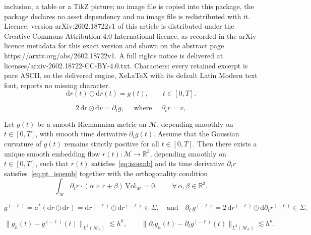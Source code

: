 \documentclass[10pt,a4paper]{amsart}
\newcommand{\Man}{\mathcal{M}}
\newcommand{\Vol}{\mathrm{Vol}}
\begin{document}
inclusion, a table or a TikZ picture; no image file is copied into this package, the package declares no asset dependency and no image file is redistributed with it. Licence: version arXiv:2602.18722v1 of this article is distributed under the Creative Commons Attribution 4.0 International licence, as recorded in the arXiv licence metadata for this exact version and shown on the abstract page https://arxiv.org/abs/2602.18722v1. A full rights notice is delivered at licenses/arxiv-2602.18722-CC-BY-4.0.txt. Characters: every retained excerpt is pure ASCII, so the delivered engine, XeLaTeX with its default Latin Modern text font, reports no missing character.
\begin{equation}\label{eq:isoemb}
\mathrm{d}r(t)\odot \mathrm{d}r(t)=g(t),\qquad t\in[0,T].
\end{equation}

\begin{equation}\label{eq:pt_isoemb}
2\,\mathrm{d}r \odot \mathrm{d}v = \partial_t g,
\quad \text{ where } \quad 
\partial_t r = v,
\end{equation}

\begin{theorem}\label{thm:wely-emb}
Let \(g(t)\) be a smooth Riemannian metric on \(\Man\), depending smoothly on \(t\in[0,T]\), with smooth time derivative \(\partial_t g(t)\).
Assume that the Gaussian curvature of \(g(t)\) remains strictly positive for all \(t\in[0,T]\).
Then there exists a {unique} smooth embedding flow \(r(t):\Man\to\mathbb{R}^3\), depending smoothly on \(t\in[0,T]\), such that \(r(t)\) satisfies~\eqref{eq:isoemb} and its time derivative \(\partial_t r\) satisfies~\eqref{eq:pt_isoemb} together with the orthogonality condition
\begin{equation}\label{eq:ptr_orth_RM}
\int_{\Man} \partial_t r \cdot (\alpha \times r + \beta)\,\Vol_{\Man} = 0,
\qquad \forall\, \alpha,\beta \in \mathbb{R}^3.
\end{equation}
\end{theorem}

\begin{equation}\label{eq:g_ell}
g^{(-\ell)} = a^*(\mathrm{d}r\odot \mathrm{d}r)
= \mathrm{d}r^{(-\ell)}\odot \mathrm{d}r^{(-\ell)} \in \Sigma,
\quad\text{and}\quad
\partial_t \, g^{(-\ell)} = 2\,\mathrm{d}r^{(-\ell)}\odot \mathrm{d}\partial_t r^{(-\ell)} \in \Sigma,
\end{equation}

\begin{equation}\label{eq:gh_app} 
    \|g_h(t) - g^{(-\ell)}(t)\|_{L^2(\Man_h)} \lesssim h^k, \qquad \|\partial_t g_h(t) - \partial_t g^{(-\ell)}(t)\|_{L^2(\Man_h)} \lesssim h^k. 
\end{equation}
\end{document}
